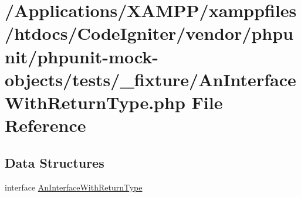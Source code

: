 \hypertarget{_an_interface_with_return_type_8php}{}\section{/\+Applications/\+X\+A\+M\+P\+P/xamppfiles/htdocs/\+Code\+Igniter/vendor/phpunit/phpunit-\/mock-\/objects/tests/\+\_\+fixture/\+An\+Interface\+With\+Return\+Type.php File Reference}
\label{_an_interface_with_return_type_8php}
\subsection*{Data Structures}
\begin{DoxyCompactItemize}
\item 
interface \mbox{\hyperlink{interface_an_interface_with_return_type}{An\+Interface\+With\+Return\+Type}}
\end{DoxyCompactItemize}
